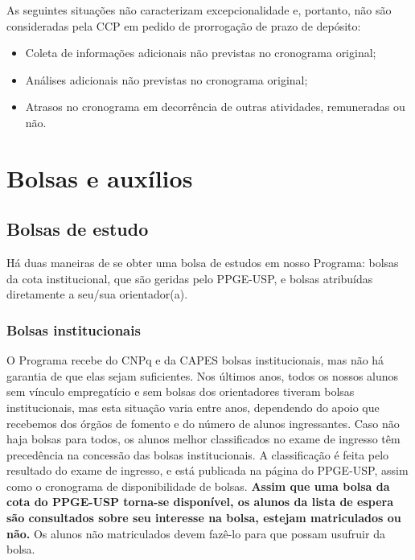 \documentclass[twoside a4paper 12pt]{report}
\begin{document}
As seguintes situações não caracterizam excepcionalidade e, portanto, não são consideradas pela CCP em pedido de prorrogação de prazo de depósito:

\begin{itemize}
\item Coleta de informações adicionais não previstas no cronograma original;
\item Análises adicionais não previstas no cronograma original;
\item Atrasos no cronograma em decorrência de outras atividades, remuneradas ou não.
\end{itemize}

\chapter{Bolsas e auxílios}

\section{Bolsas de estudo}
\label{sec:bolsas}

Há duas maneiras de se obter uma bolsa de estudos em nosso Programa: bolsas da cota institucional, que são geridas pelo PPGE-USP, e bolsas atribuídas diretamente a seu/sua orientador(a).

\subsection{Bolsas institucionais}

O Programa recebe do CNPq e da CAPES bolsas institucionais, mas não há garantia de que elas sejam suficientes. Nos últimos anos, todos os nossos alunos sem vínculo empregatício e sem bolsas dos orientadores tiveram bolsas institucionais, mas esta situação varia entre anos, dependendo do apoio que recebemos dos órgãos de fomento e do número de alunos ingressantes. Caso não haja bolsas para todos, os alunos melhor classificados no exame de ingresso têm precedência na concessão das bolsas institucionais. A classificação é feita pelo resultado do exame de ingresso, e está publicada na página do PPGE-USP, assim como o cronograma de disponibilidade de bolsas. \textbf{Assim que uma bolsa da cota do PPGE-USP torna-se disponível, os alunos da lista de espera são consultados sobre seu interesse na bolsa, estejam matriculados ou não.}  Os alunos não matriculados devem fazê-lo para que possam usufruir da bolsa.
% 
% 
\end{document}

